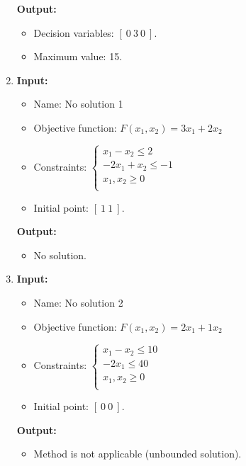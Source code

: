 \documentclass{article}
\begin{document}
\begin{enumerate}[label={(\arabic*)}, itemsep=0.25in]
          \textbf{Output:}
          \begin{itemize}
              \item Decision variables: \([ \ 0 \ 3 \ 0 \ ]\).
              \item Maximum value: 15.
          \end{itemize}

    \item \textbf{Input:}
          \begin{itemize}
              \item Name: No solution 1
              \item Objective function: \(F(x_1, x_2) = 3 x_1 + 2 x_2\)
              \item Constraints: \(\begin{cases}
                        x_1 - x_2 \le 2     \\
                        -2 x_1 + x_2 \le -1 \\
                        x_1, x_2 \ge 0      \\
                    \end{cases}\)
              \item Initial point: \([ \ 1 \ 1 \ ]\).
          \end{itemize}

          \textbf{Output:}
          \begin{itemize}
              \item No solution.
          \end{itemize}

    \item \textbf{Input:}
          \begin{itemize}
              \item Name: No solution 2
              \item Objective function: \(F(x_1, x_2) = 2 x_1 + 1 x_2\)
              \item Constraints: \(\begin{cases}
                        x_1 - x_2 \le 10     \\
                        -2 x_1 \le 40 \\
                        x_1, x_2 \ge 0      \\
                    \end{cases}\)
              \item Initial point: \([ \ 0 \ 0 \ ]\).
          \end{itemize}

          \textbf{Output:}
          \begin{itemize}
              \item Method is not applicable (unbounded solution).
          \end{itemize}      
\end{enumerate}
\end{document}
